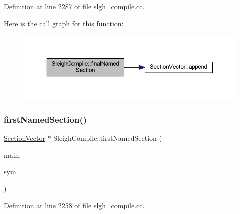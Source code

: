 Definition at line 2287 of file slgh\+\_\+compile.\+cc.

Here is the call graph for this function\+:
\nopagebreak
\begin{figure}[H]
\begin{center}
\leavevmode
\includegraphics[width=350pt]{class_sleigh_compile_a95a09437387d25e9c256633a487bd6cd_cgraph}
\end{center}
\end{figure}
\mbox{\label{class_sleigh_compile_a5b1db8a0c6f01322e117577d323c75cd}} 
\subsubsection{\texorpdfstring{firstNamedSection()}{firstNamedSection()}}
{\footnotesize\ttfamily \mbox{\hyperlink{class_section_vector}{Section\+Vector}} $\ast$ Sleigh\+Compile\+::first\+Named\+Section (\begin{DoxyParamCaption}\item[{\mbox{\hyperlink{class_construct_tpl}{Construct\+Tpl}} $\ast$}]{main,  }\item[{\mbox{\hyperlink{class_section_symbol}{Section\+Symbol}} $\ast$}]{sym }\end{DoxyParamCaption})}



Definition at line 2258 of file slgh\+\_\+compile.\+cc.

